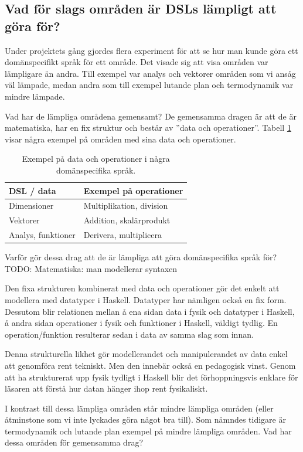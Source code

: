 \begin{binge}
\subsection{Vad för slags områden är DSLs lämpligt att göra för?}
\label{sec:lampligt}

Under projektets gång gjordes flera experiment för att se hur man kunde göra ett domänspecifikt språk för ett område. Det visade sig att visa områden var lämpligare än andra. Till exempel var analys och vektorer områden som vi ansåg väl lämpade, medan andra som till exempel lutande plan och termodynamik var mindre lämpade.

Vad har de lämpliga områdena gemensamt? De gemensamma dragen är att de är matematiska, har en fix struktur och består av ''data och operationer''. Tabell \ref{tab:data_och_ops} visar några exempel på områden med sina data och operationer.

\begin{table}[tph]
\centering
\caption{Exempel på data och operationer i några domänspecifika språk.}
\label{tab:data_och_ops}
\begin{tabular}{@{}l|l@{}}
\toprule
DSL / data & Exempel på operationer \\ \midrule
Dimensioner & Multiplikation, division \\
Vektorer & Addition, skalärprodukt \\
Analys, funktioner & Derivera, multiplicera \\ \bottomrule
\end{tabular}
\end{table}

Varför gör dessa drag att de är lämpliga att göra domänspecifika språk för? TODO: Matematiska: man modellerar syntaxen

Den fixa strukturen kombinerat med data och operationer gör det enkelt att modellera med datatyper i Haskell. Datatyper har nämligen också en fix form. Dessutom blir relationen mellan å ena sidan data i fysik och datatyper i Haskell, å andra sidan operationer i fysik och funktioner i Haskell, väldigt tydlig. En operation/funktion resulterar sedan i data av samma slag som innan.

Denna strukturella likhet gör modellerandet och manipulerandet av data enkel att genomföra rent tekniskt. Men den innebär också en pedagogisk vinst. Genom att ha strukturerat upp fysik tydligt i Haskell blir det förhoppningsvis enklare för läsaren att förstå hur datan hänger ihop rent fysikaliskt.

I kontrast till dessa lämpliga områden står mindre lämpliga områden (eller åtminstone som vi inte lyckades göra något bra till). Som nämndes tidigare är termodynamik och lutande plan exempel på mindre lämpliga områden. Vad har dessa områden för gemensamma drag?


\end{binge}
